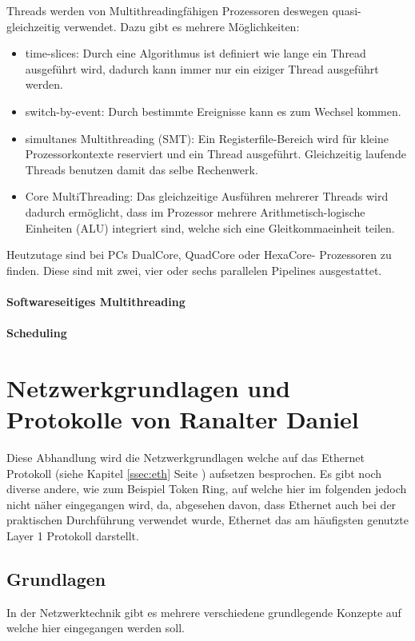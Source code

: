 \documentclass[12pt,a4paper]{report}
\begin{document}
Threads werden von Multithreadingfähigen Prozessoren deswegen quasi-gleichzeitig verwendet. Dazu gibt es mehrere Möglichkeiten:
\begin{itemize}
\item time-slices: Durch eine Algorithmus ist definiert wie lange ein Thread ausgeführt wird, dadurch kann immer nur ein eiziger Thread ausgeführt werden.
\item switch-by-event: Durch bestimmte Ereignisse kann es zum Wechsel kommen.
\item simultanes Multithreading (SMT): Ein Registerfile-Bereich wird für kleine Prozessorkontexte reserviert und ein Thread ausgeführt. Gleichzeitig laufende Threads benutzen damit das selbe Rechenwerk.
\item Core MultiThreading: Das gleichzeitige Ausführen mehrerer Threads wird dadurch ermöglicht, dass im Prozessor mehrere Arithmetisch-logische Einheiten (ALU) integriert sind, welche sich eine Gleitkommaeinheit teilen.
\end{itemize}

Heutzutage sind bei PCs DualCore, QuadCore oder HexaCore- Prozessoren zu finden. Diese sind mit zwei, vier oder sechs parallelen Pipelines ausgestattet.


\subsubsection{Softwareseitiges Multithreading}

\subsubsection{Scheduling}

\chapter{Netzwerkgrundlagen und Protokolle von Ranalter Daniel}
Diese Abhandlung wird die Netzwerkgrundlagen welche auf das Ethernet Protokoll (siehe Kapitel \ref{ssec:eth}  Seite \pageref{ssec:eth}) aufsetzen besprochen. Es gibt noch diverse andere, wie zum Beispiel Token Ring, auf welche hier im folgenden jedoch nicht näher eingegangen wird, da, abgesehen davon, dass Ethernet auch bei der praktischen Durchführung verwendet wurde, Ethernet das am häufigsten genutzte Layer 1 Protokoll darstellt. 
\section{Grundlagen}
In der Netzwerktechnik gibt es mehrere verschiedene grundlegende Konzepte auf welche hier eingegangen werden soll.
\end{document}
